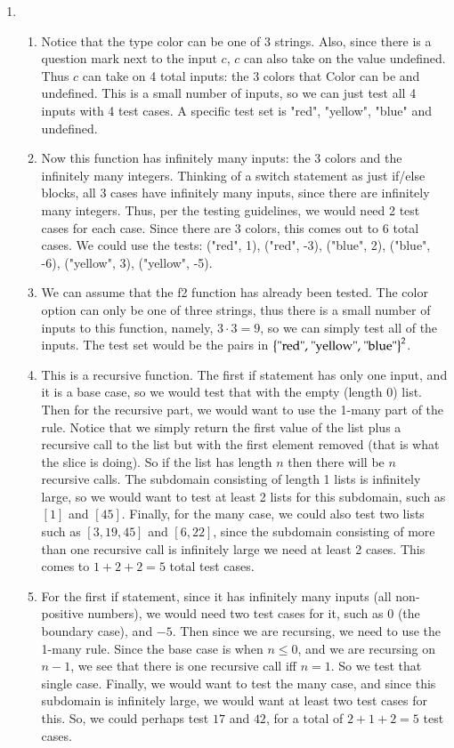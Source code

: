 \documentclass[12pt]{article}
\theoremstyle{definitionstyle}
\newcommand{\SET}[1]{\Set{\mskip-\medmuskip #1 \mskip-\medmuskip}}
\begin{document}
\begin{enumerate}[leftmargin=\labelsep]
        \newpage
        \item \begin{enumerate}[label=(\alph*)]
            \item Notice that the type color can be one of 3 strings. Also, since there is a question mark next to the input $c$, $c$ can also take on the value undefined. Thus $c$ can take on 4 total inputs: the 3 colors that Color can be and undefined. This is a small number of inputs, so we can just test all 4 inputs with 4 test cases. A specific test set is "red", "yellow", "blue" and undefined. 
            \item Now this function has infinitely many inputs: the 3 colors and the infinitely many integers. Thinking of a switch statement as just if/else blocks, all 3 cases have infinitely many inputs, since there are infinitely many integers. Thus, per the testing guidelines, we would need 2 test cases for each case. Since there are 3 colors, this comes out to 6 total cases. We could use the tests: ("red", 1), ("red", -3), ("blue", 2), ("blue", -6), ("yellow", 3), ("yellow", -5).
            \item We can assume that the f2 function has already been tested. The color option can only be one of three strings, thus there is a small number of inputs to this function, namely, $3 \cdot 3 = 9$, so we can simply test all of the inputs. The test set would be the pairs in $\SET{\text{"red", "yellow", "blue"}}^2$.
            \item This is a recursive function. The first if statement has only one input, and it is a base case, so we would test that with the empty (length 0) list. Then for the recursive part, we would want to use the 1-many part of the rule. Notice that we simply return the first value of the list plus a recursive call to the list but with the first element removed (that is what the slice is doing). So if the list has length $n$ then there will be $n$ recursive calls. The subdomain consisting of length 1 lists is infinitely large, so we would want to test at least 2 lists for this subdomain, such as $[1]$ and $[45]$. Finally, for the many case, we could also test two lists such as $[3, 19, 45]$ and $[6, 22]$, since the subdomain consisting of more than one recursive call is infinitely large we need at least 2 cases. This comes to $1 + 2 + 2 = 5$ total test cases. 
            \item For the first if statement, since it has infinitely many inputs (all non-positive numbers), we would need two test cases for it, such as $0$ (the boundary case), and $-5$. Then since we are recursing, we need to use the 1-many rule. Since the base case is when $n \leq 0$, and we are recursing on $n-1$, we see that there is one recursive call iff $n = 1$. So we test that single case. Finally, we would want to test the many case, and since this subdomain is infinitely large, we would want at least two test cases for this. So, we could perhaps test $17$ and $42$, for a total of $2 + 1 + 2 = 5$ test cases.

\end{enumerate}
\end{enumerate}
\end{document}
